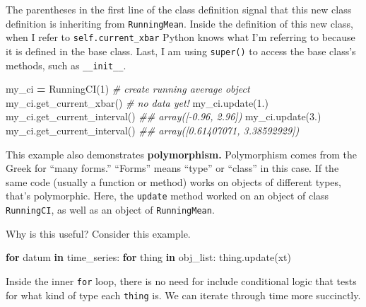 \documentclass[
  12pt,
]{krantz}
\makeatletter
\newenvironment{Shaded}{\begin{snugshade}}{\end{snugshade}}
\newcommand{\CommentTok}[1]{\textcolor[rgb]{0.37,0.37,0.37}{\textit{#1}}}
\newcommand{\ControlFlowTok}[1]{\textcolor[rgb]{0.27,0.27,0.27}{\textbf{#1}}}
\newcommand{\DecValTok}[1]{\textcolor[rgb]{0.06,0.06,0.06}{#1}}
\newcommand{\FloatTok}[1]{\textcolor[rgb]{0.06,0.06,0.06}{#1}}
\newcommand{\KeywordTok}[1]{\textcolor[rgb]{0.27,0.27,0.27}{\textbf{#1}}}
\newcommand{\NormalTok}[1]{#1}
\newcommand{\OperatorTok}[1]{\textcolor[rgb]{0.43,0.43,0.43}{\textbf{#1}}}
\newenvironment{kframe}{%
\medskip{}
\setlength{\fboxsep}{.8em}
 \def\at@end@of@kframe{}%
 \ifinner\ifhmode%
  \def\at@end@of@kframe{\end{minipage}}%
  \begin{minipage}{\columnwidth}%
 \fi\fi%
 \def\FrameCommand##1{\hskip\@totalleftmargin \hskip-\fboxsep
 \colorbox{shadecolor}{##1}\hskip-\fboxsep
     \hskip-\linewidth \hskip-\@totalleftmargin \hskip\columnwidth}%
 \MakeFramed {\advance\hsize-\width
   \@totalleftmargin\z@ \linewidth\hsize
   \@setminipage}}%
 {\par\unskip\endMakeFramed%
 \at@end@of@kframe}
\renewenvironment{Shaded}{\begin{kframe}}{\end{kframe}}
\makeatother
\begin{document}
The parentheses in the first line of the class definition signal that this new class definition is inheriting from \texttt{RunningMean}. Inside the definition of this new class, when I refer to \texttt{self.current\_xbar} Python knows what I'm referring to because it is defined in the base class. Last, I am using \texttt{super()} to access the base class's methods, such as \texttt{\_\_init\_\_}.

\begin{Shaded}
\begin{Highlighting}[]
\NormalTok{my\_ci }\OperatorTok{=}\NormalTok{ RunningCI(}\DecValTok{1}\NormalTok{) }\CommentTok{\# create running average object}
\NormalTok{my\_ci.get\_current\_xbar() }\CommentTok{\# no data yet!}
\NormalTok{my\_ci.update(}\FloatTok{1.}\NormalTok{) }
\NormalTok{my\_ci.get\_current\_interval() }
\CommentTok{\#\# array([{-}0.96,  2.96])}
\NormalTok{my\_ci.update(}\FloatTok{3.}\NormalTok{)  }
\NormalTok{my\_ci.get\_current\_interval()  }
\CommentTok{\#\# array([0.61407071, 3.38592929])}
\end{Highlighting}
\end{Shaded}

This example also demonstrates \textbf{polymorphism.} Polymorphism comes from the Greek for ``many forms.'' ``Forms'' means ``type'' or ``class'' in this case. If the same code (usually a function or method) works on objects of different types, that's polymorphic. Here, the \texttt{update} method worked on an object of class \texttt{RunningCI}, as well as an object of \texttt{RunningMean}.

Why is this useful? Consider this example.

\begin{Shaded}
\begin{Highlighting}[]
\ControlFlowTok{for}\NormalTok{ datum }\KeywordTok{in}\NormalTok{ time\_series:}
  \ControlFlowTok{for}\NormalTok{ thing }\KeywordTok{in}\NormalTok{ obj\_list:}
\NormalTok{    thing.update(xt)}
\end{Highlighting}
\end{Shaded}

Inside the inner \texttt{for} loop, there is no need for include conditional logic that tests for what kind of type each \texttt{thing} is. We can iterate through time more succinctly.
\end{document}
